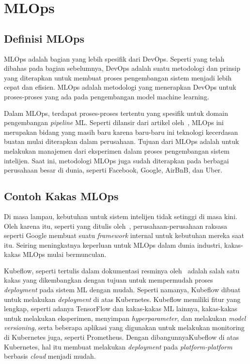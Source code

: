 \section{MLOps}


\subsection{Definisi MLOps}

MLOps adalah bagian yang lebih spesifik dari DevOps. 
Seperti yang telah dibahas pada bagian sebelumnya, DevOps adalah suatu metodologi dan prinsip yang diterapkan untuk membuat proses pengembangan sistem menjadi lebih cepat dan efisien. 
MLOps adalah metodologi yang menerapkan DevOps untuk proses-proses yang ada pada pengembangan model machine learning.

Dalam MLOps, terdapat proses-proses tertentu yang spesifik untuk domain pengembangan \textit{pipeline} ML.\@
Seperti dilansir dari artikel oleh~\cite{mlops}, MLOps ini merupakan bidang yang masih baru karena baru-baru ini teknologi kecerdasan buatan mulai diterapkan dalam perusahaan.
Tujuan dari MLOps adalah untuk melakukan manajemen dari eksperimen dalam proses pengembangan sistem intelijen.
Saat ini, metodologi MLOps juga sudah diterapkan pada berbagai perusahaan besar di dunia, seperti Facebook, Google, AirBnB, dan Uber.

\subsection{Contoh Kakas MLOps}

Di masa lampau, kebutuhan untuk sistem intelijen tidak setinggi di masa kini. 
Oleh karena itu, seperti yang ditulis oleh~\cite{mlops}, perusahaan-perusahaan raksasa seperti Google membuat suatu \textit{framework} internal untuk kebutuhan mereka saat itu.
Seiring meningkatnya keperluan untuk MLOps dalam dunia industri, kakas-kakas MLOps mulai bermunculan.

Kubeflow, seperti tertulis dalam dokumentasi resminya oleh~\cite{k8s} adalah salah satu kakas yang dikembangkan dengan tujuan untuk mempermudah proses \textit{deployment} pada sistem ML dengan mudah.
Seperti namanya, Kubeflow dibuat untuk melakukan \textit{deployment} di atas Kubernetes.
Kubeflow memiliki fitur yang lengkap, seperti adanya TensorFlow dan kakas-kakas ML lainnya, kakas-kakas untuk melakukan eksperimen, menyimpan \textit{hyperparameter}, dan melakukan \textit{model versioning}, serta beberapa aplikasi yang digunakan untuk melakukan monitoring di Kubernetes juga, seperti Prometheus.
Dengan dibangunnyaKubeflow di atas Kubernetes, hal itu membuat melakukan \textit{deployment} pada \textit{platform-platform} berbasis \textit{cloud} menjadi mudah.

